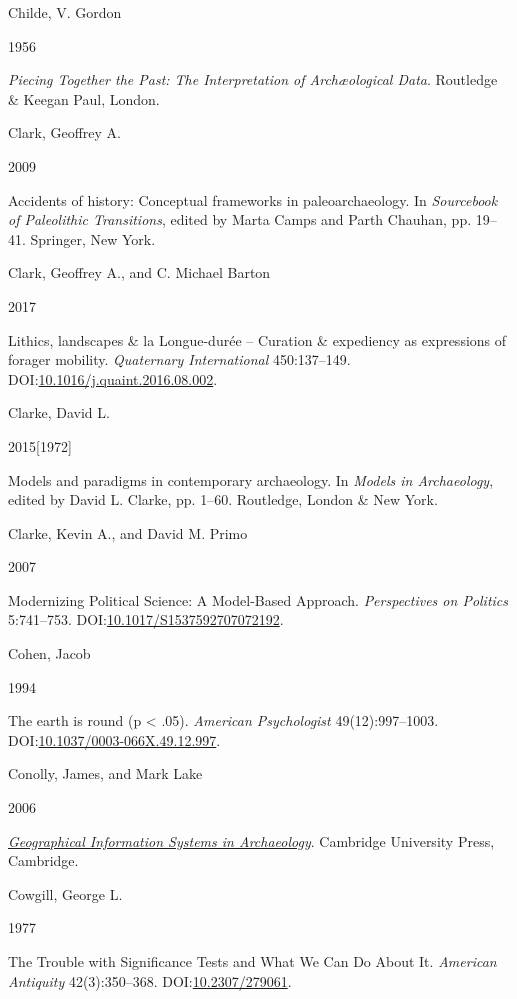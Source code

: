 \documentclass[
  a4paper,
  oneside]{uiophdthesis}
\newlength{\cslhangindent}
\newlength{\csllabelwidth}
\newlength{\cslentryspacingunit} %
\newenvironment{CSLReferences}[2] %
 {%
  \setlength{\parindent}{0pt}
  \ifodd #1
  \let\oldpar\par
  \def\par{\hangindent=\cslhangindent\oldpar}
  \fi
  \setlength{\parskip}{#2\cslentryspacingunit}
 }%
 {}
\newcommand{\CSLBlock}[1]{#1\hfill\break}
\newcommand{\CSLLeftMargin}[1]{\parbox[t]{\csllabelwidth}{#1}}
\newcommand{\CSLRightInline}[1]{\parbox[t]{\linewidth - \csllabelwidth}{#1}\break}
\begin{document}
\begin{CSLReferences}{0}{0}
\leavevmode{}%
\CSLBlock{Childe, V. Gordon}
\CSLLeftMargin{ 1956}
\CSLRightInline{\emph{{Piecing Together the Past: The Interpretation of Archæological Data}}. Routledge \& Keegan Paul, London.}

\leavevmode{}%
\CSLBlock{Clark, Geoffrey A.}
\CSLLeftMargin{ 2009}
\CSLRightInline{Accidents of history: Conceptual frameworks in paleoarchaeology. In \emph{{Sourcebook of Paleolithic Transitions}}, edited by Marta Camps and Parth Chauhan, pp. 19--41. Springer, New York.}

\leavevmode{}%
\CSLBlock{Clark, Geoffrey A., and C. Michael Barton}
\CSLLeftMargin{ 2017}
\CSLRightInline{Lithics, landscapes \& la Longue-durée -- Curation \& expediency as expressions of forager mobility. \emph{Quaternary International} 450:137--149. DOI:\href{https://doi.org/10.1016/j.quaint.2016.08.002}{10.1016/j.quaint.2016.08.002}.}

\leavevmode{}%
\CSLBlock{Clarke, David L.}
\CSLLeftMargin{ 2015{[}1972{]}}
\CSLRightInline{{Models and paradigms in contemporary archaeology}. In \emph{{Models in Archaeology}}, edited by David L. Clarke, pp. 1--60. Routledge, London \& New York.}

\leavevmode{}%
\CSLBlock{Clarke, Kevin A., and David M. Primo}
\CSLLeftMargin{ 2007}
\CSLRightInline{{Modernizing Political Science: A Model-Based Approach}. \emph{Perspectives on Politics} 5:741--753. DOI:\href{https://doi.org/10.1017/S1537592707072192}{10.1017/S1537592707072192}.}

\leavevmode{}%
\CSLBlock{Cohen, Jacob}
\CSLLeftMargin{ 1994}
\CSLRightInline{{The earth is round (p \textless{} .05)}. \emph{American Psychologist} 49(12):997--1003. DOI:\href{https://doi.org/10.1037/0003-066X.49.12.997}{10.1037/0003-066X.49.12.997}.}

\leavevmode{}%
\CSLBlock{Conolly, James, and Mark Lake}
\CSLLeftMargin{ 2006}
\CSLRightInline{\emph{\href{https://doi.org/10.1017/CBO9780511807459}{{Geographical Information Systems in Archaeology}}}. Cambridge University Press, Cambridge.}

\leavevmode{}%
\CSLBlock{Cowgill, George L.}
\CSLLeftMargin{ 1977}
\CSLRightInline{{The Trouble with Significance Tests and What We Can Do About It}. \emph{American Antiquity} 42(3):350--368. DOI:\href{https://doi.org/10.2307/279061}{10.2307/279061}.}


\end{CSLReferences}
\end{document}

